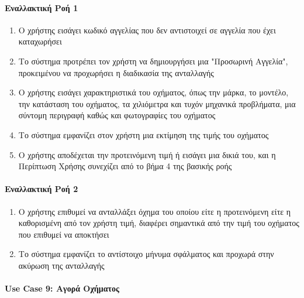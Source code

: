\documentclass{../ol-softwaremanual}
\begin{document}
   \paragraph{Εναλλακτική Ροή 1}
   
   \begin{enumerate}
   	\item Ο χρήστης εισάγει κωδικό αγγελίας που δεν αντιστοιχεί σε αγγελία που έχει καταχωρήσει
   	\item Το σύστημα προτρέπει τον χρήστη να δημιουργήσει μια \en"\gr Προσωρινή Αγγελία\en"\gr, προκειμένου να προχωρήσει η διαδικασία της ανταλλαγής
   	\item Ο χρήστης εισάγει χαρακτηριστικά του οχήματος, όπως την μάρκα, το μοντέλο, την κατάσταση του οχήματος, τα χιλιόμετρα και τυχόν μηχανικά προβλήματα, μια σύντομη περιγραφή καθώς και φωτογραφίες του οχήματος
   	\item Το σύστημα εμφανίζει στον χρήστη μια εκτίμηση της τιμής του οχήματος
   	\item Ο χρήστης αποδέχεται την προτεινόμενη τιμή ή εισάγει μια δικιά του, και η Περίπτωση Χρήσης συνεχίζει από το βήμα 4 της βασικής ροής
   	
   \end{enumerate}       
   
   
   \paragraph{Εναλλακτική Ροή 2}
   \begin{enumerate}
   	\item Ο χρήστης επιθυμεί να ανταλλάξει όχημα του οποίου είτε η προτεινόμενη είτε η καθορισμένη από τον χρήστη τιμή, διαφέρει σημαντικά από την τιμή του οχήματος που επιθυμεί να αποκτήσει
   	\item Το σύστημα εμφανίζει το αντίστοιχο μήνυμα σφάλματος και προχωρά στην ακύρωση της ανταλλαγής 
   \end{enumerate}

	\paragraph{\en Use Case 9: \gr Αγορά Οχήματος\gr}
	
\end{document}
